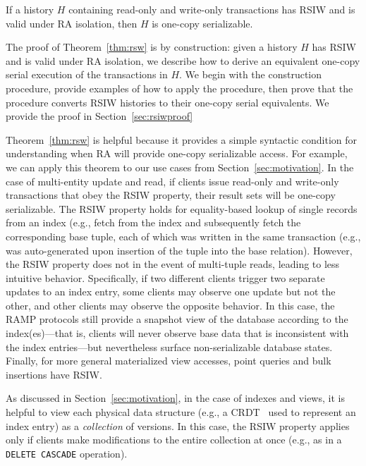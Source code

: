 \begin{theorem}
\label{thm:rsw}
If a history $H$ containing read-only and write-only transactions
has RSIW and is valid under RA isolation, then
$H$ is one-copy serializable.
\end{theorem}

The proof of Theorem~\ref{thm:rsw} is by construction: given a history
$H$ has RSIW and is valid under RA isolation, we
describe how to derive an equivalent one-copy serial execution of the
transactions in $H$. We begin with the construction procedure, provide examples
of how to apply the procedure, then prove that the procedure
converts RSIW histories to their one-copy serial equivalents. We
provide the proof in Section~\ref{sec:rsiwproof}

 Theorem~\ref{thm:rsw} is helpful because it
provides a simple syntactic condition for understanding when RA will
provide one-copy serializable access. For example, we can apply this
theorem to our use cases from Section~\ref{sec:motivation}. In the
case of multi-entity update and read, if clients issue read-only and
write-only transactions that obey the RSIW property, their result sets
will be one-copy serializable. The RSIW property holds for
equality-based lookup of single records from an index (e.g., fetch
from the index and subsequently fetch the corresponding base tuple,
each of which was written in the same transaction (e.g., was
auto-generated upon insertion of the tuple into the base
relation). However, the RSIW property does not in the event of
multi-tuple reads, leading to less intuitive behavior. Specifically,
if two different clients trigger two separate updates to an index
entry, some clients may observe one update but not the other, and
other clients may observe the opposite behavior. In this case, the
RAMP protocols still provide a snapshot view of the database according
to the index(es)---that is, clients will never observe base data that
is inconsistent with the index entries---but nevertheless surface
non-serializable database states. Finally, for more general
materialized view accesses, point queries and bulk insertions have
RSIW.

As discussed in Section~\ref{sec:motivation}, in the case of indexes
and views, it is helpful to view each physical data structure (e.g.,
a CRDT~\cite{crdt} used to represent an index entry) as a
\textit{collection} of versions. In this case, the RSIW property
applies only if clients make modifications to the entire collection at
once (e.g., as in a \texttt{DELETE CASCADE} operation).

